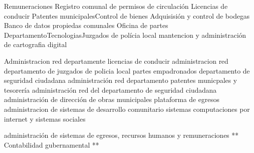 
Remuneraciones
Registro comunal de permisos de circulación
Licencias de conducir
Patentes municipalesControl de bienes
Adquisisión y control de bodegas
Banco de datos propiedas comunales
Oficina de partes
DepartamentoTecnologiasJuzgados de polícia local
mantencion y administración de cartografia digital


Administracion red departamente licencias de conducir
administracion red departamento de juzgados de policia local
partes empadronados departamento de seguridad ciudadana
administración red departamento patentes municpales y tesorería
administración red del departamento de seguridad ciudadana
administración de dirección de obras municipales
plataforma de egresos
administracion de sistemas de desarrollo comunitario
sistemas computaciones por internet y sistemas sociales


administración de sistemas de egresos, recursos humanos y remuneraciones **
Contabilidad gubernamental **




